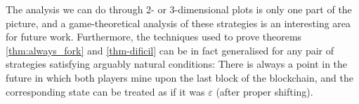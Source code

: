 The analysis we can do  through 2- or 3-dimensional plots is only one part of the picture, and a game-theoretical analysis of these strategies is an interesting area for future work. 
Furthermore, the techniques used to prove theorems \ref{thm:always_fork} and \ref{thm-dificil} can be in fact generalised for any pair of strategies satisfying arguably natural conditions: There is always a point in the future in which both players mine upon the last block of the blockchain, and the corresponding state can be treated as if it was $\varepsilon$ (after proper shifting).



